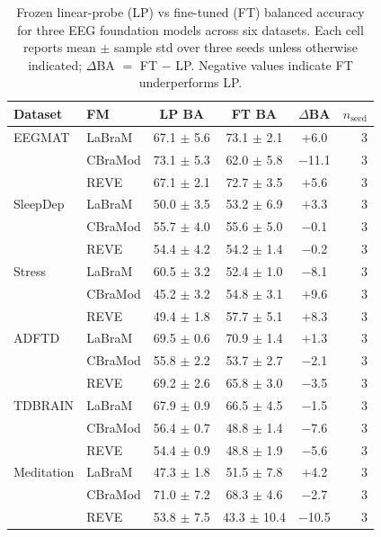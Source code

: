 \begin{table}[t]
\centering
\caption{Frozen linear-probe (LP) vs fine-tuned (FT) balanced accuracy for three EEG foundation models across six datasets. Each cell reports mean $\pm$ sample std over three seeds unless otherwise indicated; $\Delta$BA $=$ FT $-$ LP. Negative values indicate FT underperforms LP.}
\label{tab:fm_performance}
\begin{tabular}{llcccr}
\toprule
Dataset & FM & LP BA & FT BA & $\Delta$BA & $n_{\mathrm{seed}}$ \\
\midrule
EEGMAT & LaBraM & 67.1 $\pm$ 5.6 & 73.1 $\pm$ 2.1 & $+$6.0 & 3 \\
 & CBraMod & 73.1 $\pm$ 5.3 & 62.0 $\pm$ 5.8 & $-$11.1 & 3 \\
 & REVE & 67.1 $\pm$ 2.1 & 72.7 $\pm$ 3.5 & $+$5.6 & 3 \\
SleepDep & LaBraM & 50.0 $\pm$ 3.5 & 53.2 $\pm$ 6.9 & $+$3.3 & 3 \\
 & CBraMod & 55.7 $\pm$ 4.0 & 55.6 $\pm$ 5.0 & $-$0.1 & 3 \\
 & REVE & 54.4 $\pm$ 4.2 & 54.2 $\pm$ 1.4 & $-$0.2 & 3 \\
Stress & LaBraM & 60.5 $\pm$ 3.2 & 52.4 $\pm$ 1.0 & $-$8.1 & 3 \\
 & CBraMod & 45.2 $\pm$ 3.2 & 54.8 $\pm$ 3.1 & $+$9.6 & 3 \\
 & REVE & 49.4 $\pm$ 1.8 & 57.7 $\pm$ 5.1 & $+$8.3 & 3 \\
\midrule
ADFTD & LaBraM & 69.5 $\pm$ 0.6 & 70.9 $\pm$ 1.4 & $+$1.3 & 3 \\
 & CBraMod & 55.8 $\pm$ 2.2 & 53.7 $\pm$ 2.7 & $-$2.1 & 3 \\
 & REVE & 69.2 $\pm$ 2.6 & 65.8 $\pm$ 3.0 & $-$3.5 & 3 \\
TDBRAIN & LaBraM & 67.9 $\pm$ 0.9 & 66.5 $\pm$ 4.5 & $-$1.5 & 3 \\
 & CBraMod & 56.4 $\pm$ 0.7 & 48.8 $\pm$ 1.4 & $-$7.6 & 3 \\
 & REVE & 54.4 $\pm$ 0.9 & 48.8 $\pm$ 1.9 & $-$5.6 & 3 \\
Meditation & LaBraM & 47.3 $\pm$ 1.8 & 51.5 $\pm$ 7.8 & $+$4.2 & 3 \\
 & CBraMod & 71.0 $\pm$ 7.2 & 68.3 $\pm$ 4.6 & $-$2.7 & 3 \\
 & REVE & 53.8 $\pm$ 7.5 & 43.3 $\pm$ 10.4 & $-$10.5 & 3 \\
\bottomrule
\end{tabular}
\end{table}

